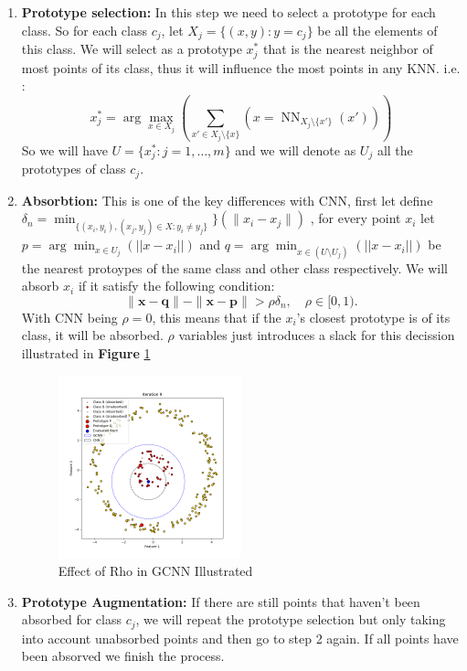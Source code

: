 \begin{enumerate}
	\item \textbf{Prototype selection:} In this step we need to select a prototype for each class. So for each class $c_j$, let $X_j= \{ (x,y) : y=c_j\}$ be all the elements of this class. We will select as a prototype $x_j^*$ that is the nearest neighbor of most points of its class, thus it will influence the most points in any KNN. i.e. : 
	$$
	x_j^* = \arg\max_{x \in X_j} \left( \sum_{x' \in X_j \setminus \{x\}}\left(x = \operatorname{NN}_{X_j \setminus \{x'\}}(x')\right) \right)
	$$
	So we will have $U = \{ x_j^* : j = 1,\ldots, m \}$ and we will denote as $U_j$ all the prototypes of class $c_j$.
	
	\item \textbf{Absorbtion:} This is one of the key differences with CNN, first let define $\delta_n = \min_{\{ (x_i,y_i), (x_j, y_j) \in X : y_i \neq y_j\}}\}\left( \|x_i - x_j\| \right)$ , for every point $x_i$ let $p = \arg\min_{x \in U_j}\left( ||x-x_i|| \right)$ and $q = \arg\min_{x \in \left( U \setminus U_j \right)}\left( ||x-x_i|| \right)$ be the nearest protoypes of the same class and other class respectively. We will absorb $x_i$ if it satisfy the following condition:
	$$
	\| \mathbf{x} - \mathbf{q} \| - \| \mathbf{x} - \mathbf{p} \| > \rho \delta_n, \quad \rho \in [0, 1).
	$$
	With CNN being $\rho=0$, this means that if the $x_i$'s closest prototype is of its class, it will be absorbed. $\rho$ variables just introduces a slack for this decission illustrated in \textbf{Figure} \ref{fig:gcnnRhoIllustration}
	
	\begin{figure}[ht]
		\centering
		\includegraphics[width=0.5\textwidth]{figures/gcnn/gcnnRhoIllustration}
		\caption{Effect of Rho in GCNN Illustrated}
		\label{fig:gcnnRhoIllustration}
	\end{figure}
	
	\item \textbf{Prototype Augmentation:} If there are still points that haven't been absorbed for class $c_j$, we will repeat the prototype selection but only taking into account unabsorbed points and then go to step 2 again. If all points have been absorved we finish the process.
\end{enumerate}

